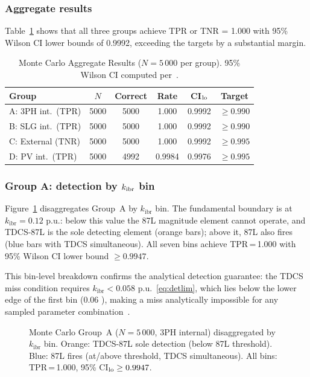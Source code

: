 \documentclass[journal,twoside,10pt]{IEEEtran}
\newcommand{\kibr}{k_{\mathrm{ibr}}}
\newcommand{\pu}{\,\text{p.u.}}
\begin{document}
\subsubsection{Aggregate results}

Table~\ref{tab:mc} shows that all three groups achieve TPR or TNR = 1.000
with 95\% Wilson CI lower bounds of 0.9992, exceeding the targets by a
substantial margin.

\begin{table}[!t]
\centering
\caption{Monte Carlo Aggregate Results ($N=5\,000$ per group).
         95\% Wilson CI computed per~\cite{Wilson1927}.}
\label{tab:mc}
\renewcommand{\arraystretch}{1.08}
\footnotesize\setlength{\tabcolsep}{4pt}
\begin{tabular}{p{2.4cm}ccccc}
\toprule
Group & $N$ & Correct & Rate & CI$_{\rm lo}$ & Target \\
\midrule
A: 3PH int.\ (TPR)  & 5000 & 5000 & 1.000  & 0.9992 & $\geq 0.990$ \\
B: SLG int.\ (TPR)  & 5000 & 5000 & 1.000  & 0.9992 & $\geq 0.990$ \\
C: External (TNR)   & 5000 & 5000 & 1.000  & 0.9992 & $\geq 0.995$ \\
D: PV int.\ (TPR)   & 5000 & 4992 & 0.9984 & 0.9976 & $\geq 0.995$ \\
\bottomrule
\end{tabular}
\end{table}

\subsubsection{Group A: detection by $k_{\rm ibr}$ bin}

Figure~\ref{fig:mc} disaggregates Group~A by $\kibr$ bin.  The
fundamental boundary is at $\kibr = 0.12\,\pu$: below this value the
87L magnitude element cannot operate, and TDCS-87L is the sole detecting
element (orange bars); above it, 87L also fires (blue bars with TDCS
simultaneous).  All seven bins achieve TPR\,=\,1.000 with 95\% Wilson CI
lower bound $\geq 0.9947$.

This bin-level breakdown confirms the analytical detection guarantee: the
TDCS miss condition requires $\kibr < 0.058\,\pu$~\eqref{eq:detlim},
which lies below the lower edge of the first bin (0.06\,\pu), making a
miss analytically impossible for any sampled parameter
combination~\cite{SAMBP_TR26}.

\begin{figure}[!t]
  \centering
  
  \caption{Monte Carlo Group~A ($N=5\,000$, 3PH internal) disaggregated
           by $\kibr$ bin.  Orange: TDCS-87L sole detection (below 87L
           threshold).  Blue: 87L fires (at/above threshold, TDCS
           simultaneous).  All bins: TPR\,=\,1.000,
           95\% CI$_{\rm lo} \geq 0.9947$.}
  \label{fig:mc}
\end{figure}
\end{document}
